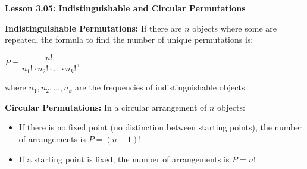 \begin{center}
\textbf{Lesson 3.05: Indistinguishable and Circular Permutations}
\end{center}

\vspace*{-1.5ex}

\noindent \textbf{Indistinguishable Permutations:} If there are \(n\) objects where some are repeated, the formula to find the number of unique permutations is:

{\centering $ 
    P = \dfrac{n!}{n_1! \cdot n_2! \cdot \ldots \cdot n_k!},
 $\par}
    where \(n_1, n_2, \ldots, n_k\) are the frequencies of indistinguishable objects.

\noindent \textbf{Circular Permutations:} In a circular arrangement of \(n\) objects:
    \begin{itemize}
        \item If there is no fixed point (no distinction between starting points), the number of arrangements is \( P = (n-1)!\)
        
        \item If a starting point is fixed, the number of arrangements is \(P = n!\)
        
    \end{itemize}



